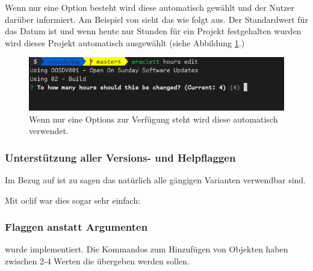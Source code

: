 \documentclass[oneside,bibliography=totocnumbered,BCOR=5mm]{scrbook}
\newenvironment{code}{\captionsetup{type=listing, skip=0pt}}{}
\begin{document}
\medskip

Wenn nur eine Option besteht wird diese automatisch gewählt und der Nutzer
darüber informiert. Am Beispiel von  sieht das wie folgt
aus. Der Standardwert für das Datum ist  und wenn heute nur
Stunden für ein Projekt festgehalten wurden wird dieses Projekt automatisch
ausgewählt (siehe Abbildung \ref{fig:hours-edit-defaults}.)

\begin{figure}
  \centering
  \includegraphics[scale=0.5]{hours-edit-defaults.png}
  \caption{Wenn nur eine Options zur Verfügung steht wird diese automatisch verwendet.}
  \label{fig:hours-edit-defaults}
\end{figure}

\subsubsection{Unterstützung aller Versions- und Helpflaggen}

Im Bezug auf  ist zu sagen das natürlich alle
gängigen Varianten verwendbar sind.

Mit oclif war dies sogar sehr einfach:
\begin{code}
  \begin{javascriptcode}
...
"oclif": {
  "additionalHelpFlags": [
    "-h",
    "help"
  ],
  "additionalVersionFlags": [
    "-v",
    "-V",
    "version"
  ],
  ...
  \end{javascriptcode}
  \medskip
\end{code}

\subsubsection{Flaggen anstatt Argumenten}

 wurde implementiert. Die Kommandos zum Hinzufügen
von Objekten haben zwischen 2-4 Werten die übergeben werden sollen.
\end{document}
